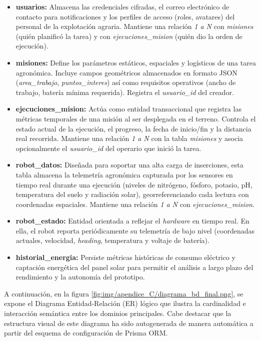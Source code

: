 \begin{itemize}
    \item \textbf{usuarios:} Almacena las credenciales cifradas, el correo electrónico de contacto para notificaciones y los perfiles de acceso (roles, avatares) del personal de la explotación agraria. Mantiene una relación \textit{1 a N} con \textit{misiones} (quién planificó la tarea) y con \textit{ejecuciones\_mision} (quién dio la orden de ejecución).
    \item \textbf{misiones:} Define los parámetros estáticos, espaciales y logísticos de una tarea agronómica. Incluye campos geométricos almacenados en formato JSON (\textit{area\_trabajo}, \textit{puntos\_interes}) así como requisitos operativos (ancho de trabajo, batería mínima requerida). Registra el \textit{usuario\_id} del creador.
    \item \textbf{ejecuciones\_mision:} Actúa como entidad transaccional que registra las métricas temporales de una misión al ser desplegada en el terreno. Controla el estado actual de la ejecución, el progreso, la fecha de inicio/fin y la distancia real recorrida. Mantiene una relación \textit{1 a N} con la tabla \textit{misiones} y asocia opcionalmente el \textit{usuario\_id} del operario que inició la tarea.
    \item \textbf{robot\_datos:} Diseñada para soportar una alta carga de inserciones, esta tabla almacena la telemetría agronómica capturada por los sensores en tiempo real durante una ejecución (niveles de nitrógeno, fósforo, potasio, pH, temperatura del suelo y radiación solar), georreferenciando cada lectura con coordenadas espaciales. Mantiene una relación \textit{1 a N} con \textit{ejecuciones\_mision}.
    \item \textbf{robot\_estado:} Entidad orientada a reflejar el \textit{hardware} en tiempo real. En ella, el robot reporta periódicamente su telemetría de bajo nivel (coordenadas actuales, velocidad, \textit{heading}, temperatura y voltaje de batería).
    \item \textbf{historial\_energia:} Persiste métricas históricas de consumo eléctrico y captación energética del panel solar para permitir el análisis a largo plazo del rendimiento y la autonomía del prototipo.
\end{itemize}

A continuación, en la figura \ref{fig:img/apendice_C/diagrama_bd_final.png}, se expone el Diagrama Entidad-Relación (ER) lógico que ilustra la cardinalidad e interacción semántica entre los dominios principales. Cabe destacar que la estructura visual de este diagrama ha sido autogenerada de manera automática a partir del esquema de configuración de Prisma ORM.

